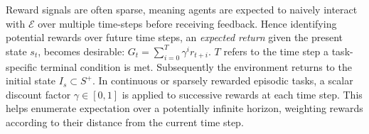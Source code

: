 \documentclass[runningheads]{llncs}
\begin{document}
Reward signals are often sparse, meaning agents are expected to naively interact with $\mathcal{E}$ over multiple time-steps before receiving feedback. Hence identifying potential rewards over future time steps, an \textit{expected return} given the present state $s_t$, becomes desirable: \begin{math}
	G_t = \sum_{i=0}^{T} \gamma^{i}r_{t+i}.
\end{math}
$T$ refers to the time step a task-specific terminal condition is met. Subsequently the environment returns to the initial state $I_s \subset S^+ $. In continuous or sparsely rewarded episodic tasks, a scalar discount factor $\gamma \in [0,1]$ is applied to successive rewards at each time step. This helps enumerate expectation over a potentially infinite horizon, weighting rewards according to their distance from the current time step. \\
\end{document}
